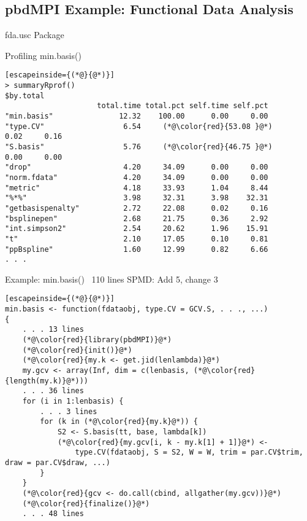 \subsection{pbdMPI Example: Functional Data Analysis}
\makesubcontentsslidessec


\begin{frame}[fragile]{fda.usc Package}
  \begin{block}{Profiling min.basis()}\pause
    \vspace{-2ex}
    \begin{lstlisting}[escapeinside={(*@}{@*)}]
> summaryRprof()
$by.total
                     total.time total.pct self.time self.pct
"min.basis"               12.32    100.00      0.00     0.00
"type.CV"                  6.54     (*@\color{red}{53.08 }@*)      0.02     0.16
"S.basis"                  5.76     (*@\color{red}{46.75 }@*)      0.00     0.00
"drop"                     4.20     34.09      0.00     0.00
"norm.fdata"               4.20     34.09      0.00     0.00
"metric"                   4.18     33.93      1.04     8.44
"%*%"                      3.98     32.31      3.98    32.31
"getbasispenalty"          2.72     22.08      0.02     0.16
"bsplinepen"               2.68     21.75      0.36     2.92
"int.simpson2"             2.54     20.62      1.96    15.91
"t"                        2.10     17.05      0.10     0.81
"ppBspline"                1.60     12.99      0.82     6.66
. . .
    \end{lstlisting}
  \end{block}
\end{frame}

\begin{frame}[fragile]
  \begin{block}{Example: min.basis() ~110 lines \hfill SPMD: Add 5, change 3}\pause
    \begin{lstlisting}[escapeinside={(*@}{@*)}]
min.basis <- function(fdataobj, type.CV = GCV.S, . . ., ...)
{
    . . . 13 lines
    (*@\color{red}{library(pbdMPI)}@*)
    (*@\color{red}{init()}@*)
    (*@\color{red}{my.k <- get.jid(lenlambda)}@*)
    my.gcv <- array(Inf, dim = c(lenbasis, (*@\color{red}{length(my.k)}@*)))
    . . . 36 lines
    for (i in 1:lenbasis) {
        . . . 3 lines
        for (k in (*@\color{red}{my.k}@*)) {
            S2 <- S.basis(tt, base, lambda[k])
            (*@\color{red}{my.gcv[i, k - my.k[1] + 1]}@*) <-
                type.CV(fdataobj, S = S2, W = W, trim = par.CV$trim, draw = par.CV$draw, ...)
        }
    }
    (*@\color{red}{gcv <- do.call(cbind, allgather(my.gcv))}@*)
    (*@\color{red}{finalize()}@*)
    . . . 48 lines
    \end{lstlisting} %
  \end{block}
\end{frame}
